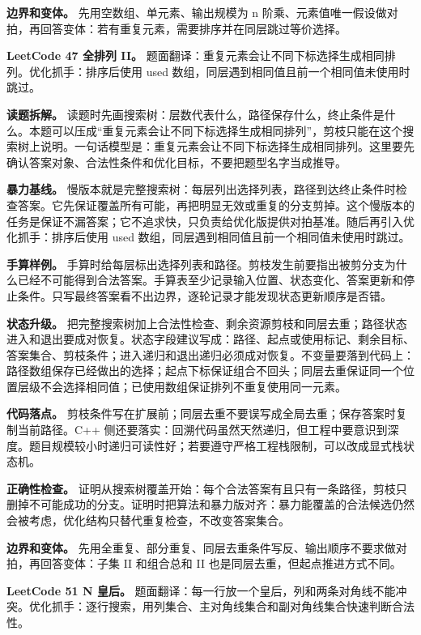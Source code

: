 \textbf{边界和变体。} 先用空数组、单元素、输出规模为 n 阶乘、元素值唯一假设做对拍，再回答变体：若有重复元素，需要排序并在同层跳过等价选择。

\noindent\textbf{LeetCode 47 全排列 II。} 题面翻译：重复元素会让不同下标选择生成相同排列。优化抓手：排序后使用 used 数组，同层遇到相同值且前一个相同值未使用时跳过。

\textbf{读题拆解。} 读题时先画搜索树：层数代表什么，路径保存什么，终止条件是什么。本题可以压成“重复元素会让不同下标选择生成相同排列”，剪枝只能在这个搜索树上说明。一句话模型是：重复元素会让不同下标选择生成相同排列。这里要先确认答案对象、合法性条件和优化目标，不要把题型名字当成推导。

\textbf{暴力基线。} 慢版本就是完整搜索树：每层列出选择列表，路径到达终止条件时检查答案。它先保证覆盖所有可能，再把明显无效或重复的分支剪掉。这个慢版本的任务是保证不漏答案；它不追求快，只负责给优化版提供对拍基准。随后再引入优化抓手：排序后使用 used 数组，同层遇到相同值且前一个相同值未使用时跳过。

\textbf{手算样例。} 手算时给每层标出选择列表和路径。剪枝发生前要指出被剪分支为什么已经不可能得到合法答案。手算表至少记录输入位置、状态变化、答案更新和停止条件。只写最终答案看不出边界，逐轮记录才能发现状态更新顺序是否错。

\textbf{状态升级。} 把完整搜索树加上合法性检查、剩余资源剪枝和同层去重；路径状态进入和退出要成对恢复。状态字段建议写成：路径、起点或使用标记、剩余目标、答案集合、剪枝条件；进入递归和退出递归必须成对恢复。不变量要落到代码上：路径数组保存已经做出的选择；起点下标保证组合不回头；同层去重保证同一个位置层级不会选择相同值；已使用数组保证排列不重复使用同一元素。

\textbf{代码落点。} 剪枝条件写在扩展前；同层去重不要误写成全局去重；保存答案时复制当前路径。C++ 侧还要落实：回溯代码虽然天然递归，但工程中要意识到深度。题目规模较小时递归可读性好；若要遵守严格工程栈限制，可以改成显式栈状态机。

\textbf{正确性检查。} 证明从搜索树覆盖开始：每个合法答案有且只有一条路径，剪枝只删掉不可能成功的分支。证明时把算法和暴力版对齐：暴力能覆盖的合法候选仍然会被考虑，优化结构只替代重复检查，不改变答案集合。

\textbf{边界和变体。} 先用全重复、部分重复、同层去重条件写反、输出顺序不要求做对拍，再回答变体：子集 II 和组合总和 II 也是同层去重，但起点推进方式不同。

\noindent\textbf{LeetCode 51 N 皇后。} 题面翻译：每一行放一个皇后，列和两条对角线不能冲突。优化抓手：逐行搜索，用列集合、主对角线集合和副对角线集合快速判断合法性。

